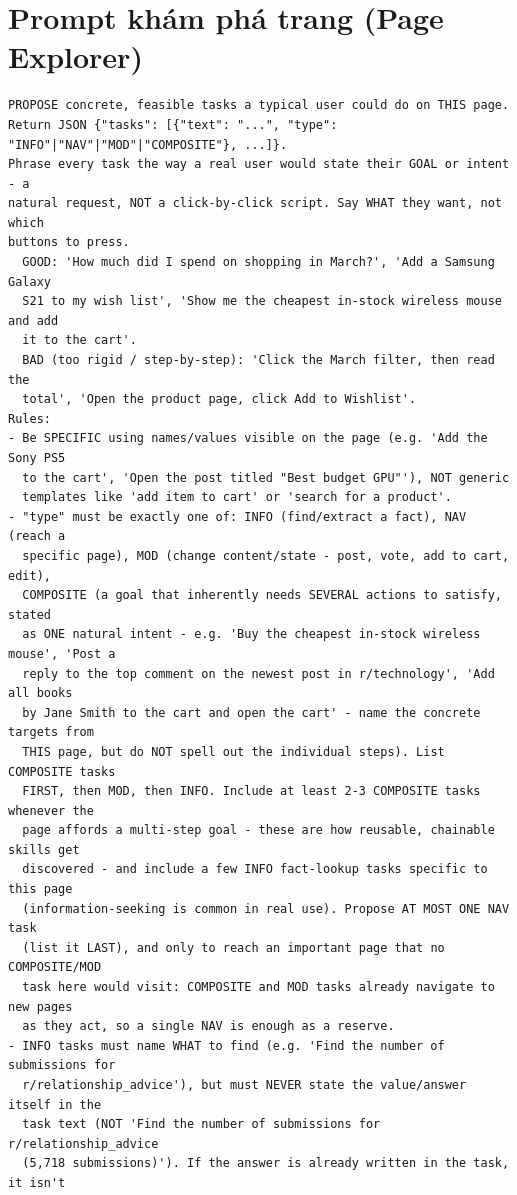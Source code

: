 \section{Prompt khám phá trang (Page Explorer)}
\label{app:prompt-explorer}

\begin{lstlisting}[style=mystyle,numbers=none,basicstyle=\scriptsize\ttfamily]
PROPOSE concrete, feasible tasks a typical user could do on THIS page.
Return JSON {"tasks": [{"text": "...", "type": "INFO"|"NAV"|"MOD"|"COMPOSITE"}, ...]}.
Phrase every task the way a real user would state their GOAL or intent - a
natural request, NOT a click-by-click script. Say WHAT they want, not which
buttons to press.
  GOOD: 'How much did I spend on shopping in March?', 'Add a Samsung Galaxy
  S21 to my wish list', 'Show me the cheapest in-stock wireless mouse and add
  it to the cart'.
  BAD (too rigid / step-by-step): 'Click the March filter, then read the
  total', 'Open the product page, click Add to Wishlist'.
Rules:
- Be SPECIFIC using names/values visible on the page (e.g. 'Add the Sony PS5
  to the cart', 'Open the post titled "Best budget GPU"'), NOT generic
  templates like 'add item to cart' or 'search for a product'.
- "type" must be exactly one of: INFO (find/extract a fact), NAV (reach a
  specific page), MOD (change content/state - post, vote, add to cart, edit),
  COMPOSITE (a goal that inherently needs SEVERAL actions to satisfy, stated
  as ONE natural intent - e.g. 'Buy the cheapest in-stock wireless mouse', 'Post a
  reply to the top comment on the newest post in r/technology', 'Add all books
  by Jane Smith to the cart and open the cart' - name the concrete targets from
  THIS page, but do NOT spell out the individual steps). List COMPOSITE tasks
  FIRST, then MOD, then INFO. Include at least 2-3 COMPOSITE tasks whenever the
  page affords a multi-step goal - these are how reusable, chainable skills get
  discovered - and include a few INFO fact-lookup tasks specific to this page
  (information-seeking is common in real use). Propose AT MOST ONE NAV task
  (list it LAST), and only to reach an important page that no COMPOSITE/MOD
  task here would visit: COMPOSITE and MOD tasks already navigate to new pages
  as they act, so a single NAV is enough as a reserve.
- INFO tasks must name WHAT to find (e.g. 'Find the number of submissions for
  r/relationship_advice'), but must NEVER state the value/answer itself in the
  task text (NOT 'Find the number of submissions for r/relationship_advice
  (5,718 submissions)'). If the answer is already written in the task, it isn't

\end{lstlisting}
